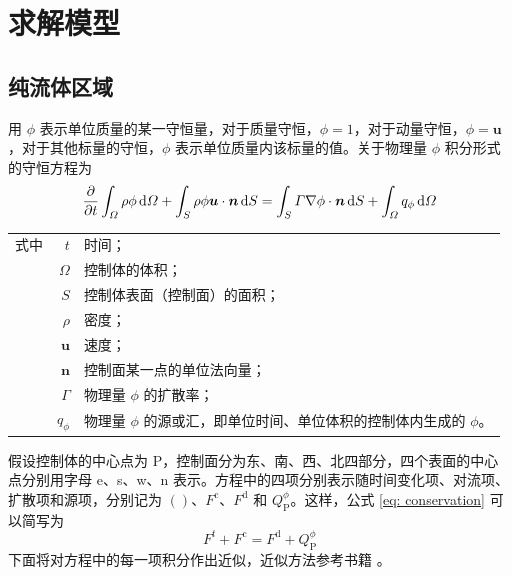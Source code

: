 


\section{求解模型}\label{sec: model} %

\subsection{纯流体区域}

用 $\phi$ 表示单位质量的某一守恒量，对于质量守恒，$\phi=1$，对于动量守恒，$\phi=\bm{u}$，对于其他标量的守恒，$\phi$ 表示单位质量内该标量的值。关于物理量 $\phi$ 积分形式的守恒方程为
\begin{equation}\label{eq: conservation}
	\frac{\partial}{\partial t}\int_{\varOmega}\rho\phi\,\mathrm{d}\varOmega +
	\int_S\rho\phi\bm{u}\cdot\bm{n}\,\mathrm{d} S =
	\int_S\varGamma\nabla\phi\cdot\bm{n}\,\mathrm{d} S +
	\int_{\varOmega}q_{\phi}\,\mathrm{d}\varOmega
\end{equation}
\begin{tabularx}{\textwidth}{@{}l@{\quad}r@{——}X@{}}
	式中 & $t$ & 时间；\\
		& $\varOmega$ & 控制体的体积；\\
		& $S$ & 控制体表面（控制面）的面积；\\
		& $\rho$ & 密度；\\
		& $\bm{u}$ & 速度；\\
		& $\bm{n}$ & 控制面某一点的单位法向量；\\
		& $\varGamma$ & 物理量 $\phi$ 的扩散率；\\
		& $q_{\phi}$ & 物理量 $\phi$ 的源或汇，即单位时间、单位体积的控制体内生成的 $\phi$。
\end{tabularx}\vspace{3.15bp}
假设控制体的中心点为 P，控制面分为东、南、西、北四部分，四个表面的中心点分别用字母 e、s、w、n 表示。方程中的四项分别表示随时间变化项、对流项、扩散项和源项，分别记为 $()$、$F^{\mathrm{c}}$、$F^{\mathrm{d}}$ 和 $Q_{\mathrm{P}}^{\phi}$。这样，公式 \eqref{eq: conservation} 可以简写为
\begin{equation}
	F^t + F^{\mathrm{c}} = F^{\mathrm{d}} + Q_{\mathrm{P}}^{\phi}
\end{equation}
下面将对方程中的每一项积分作出近似，近似方法参考书籍 。

